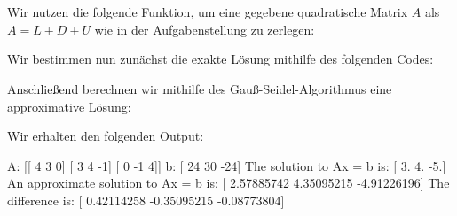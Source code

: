 \section{}

Wir nutzen die folgende Funktion, um eine gegebene quadratische Matrix $A$ als $A = L + D + U$ wie in der Aufgabenstellung zu zerlegen:



Wir bestimmen nun zunächst die exakte Lösung mithilfe des folgenden Codes:



Anschließend berechnen wir mithilfe des Gauß-Seidel-Algorithmus eine approximative Lösung:



Wir erhalten den folgenden Output:

\begin{consoleoutput}
A:
[[ 4  3  0]
 [ 3  4 -1]
 [ 0 -1  4]]
b:
[ 24  30 -24]
The solution to Ax = b is:
[ 3.  4. -5.]
An approximate solution to Ax = b is:
[ 2.57885742  4.35095215 -4.91226196]
The difference is:
[ 0.42114258 -0.35095215 -0.08773804]
\end{consoleoutput}
